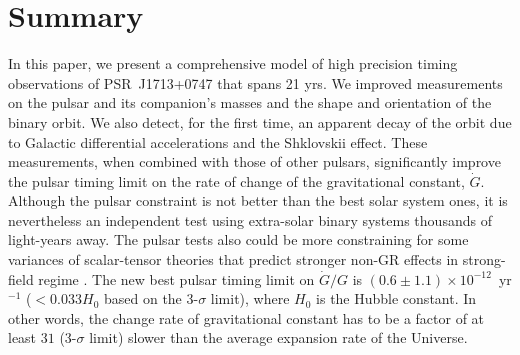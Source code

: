 
\section{Summary}
In this paper, we present a comprehensive model of high precision timing observations of
PSR~J1713+0747 that spans 21 yrs. 
We improved measurements on the pulsar and its companion's masses and the
shape and orientation of the binary orbit. We also detect, for the first time, an apparent
decay of the orbit due to Galactic differential accelerations and the Shklovskii effect.
These measurements, when combined with those of other pulsars, 
significantly improve the pulsar timing limit on the rate of change of the gravitational
constant, $\dot{G}$. Although the pulsar constraint is not better than the
best solar system ones, it is nevertheless an independent test using 
extra-solar binary systems thousands of light-years away. The pulsar tests
also could be more constraining for some
variances of scalar-tensor theories that predict stronger non-GR effects in
strong-field regime \citep{wex14}.
The new best pulsar timing limit on $\dot{G}/G$ is 
$(0.6\pm1.1)\times10^{-12}$~yr$^{-1}$ ($<0.033H_0$ based on the 3-$\sigma$ limit), where $H_0$ is the Hubble constant. 
In other words, the change rate of gravitational constant has to be a factor
of at least $31$ (3-$\sigma$ limit) slower than the average expansion rate of
the Universe.


